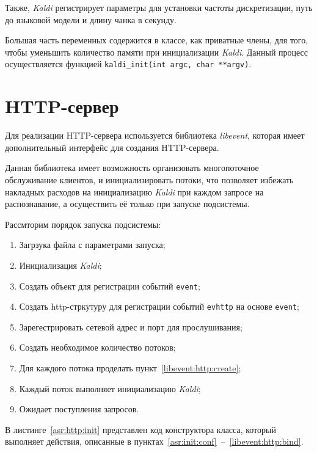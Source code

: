 Также, \textit{Kaldi} регистрирует параметры для установки частоты дискретизации,
путь до языковой модели и длину чанка в секунду.

Большая часть переменных содержится в классе, как приватные члены, для того, чтобы
уменьшить количество памяти при инициализации \textit{Kaldi}.
Данный процесс осуществляется функцией \texttt{kaldi\_init(int argc, char **argv)}.
\section{HTTP-сервер}

Для реализации HTTP-сервера используется библиотека \textit{libevent}, которая
имеет дополнительный интерфейс для создания HTTP-сервера.

Данная библиотека имеет возможность организовать многопоточное обслуживание клиентов,
и инициализировать потоки, что позволяет избежать накладных расходов на инициализацию
\textit{Kaldi} при каждом запросе на распознавание, а осуществить её только
при запуске подсистемы.

Рассмторим порядок запуска подсистемы:
\begin{enumerate}
    \item Загрзука файла с параметрами запуска;\label{asr:init:conf}
    \item Инициализация \textit{Kaldi};\label{asr:init:kaldi}
    \item Создать объект для регистрации событий \texttt{event};\label{libevent:event:create}
    \item Создать http-стркутуру для регистрации событий \texttt{evhttp}
        на основе \texttt{event};\label{libevent:http:create}
    \item Зарегестрировать сетевой адрес и порт для прослушивания;\label{libevent:http:bind}
    \item Создать необходимое количество потоков;
    \item Для каждого потока проделать пункт~\ref{libevent:http:create};
    \item Каждый поток выполняет инициализацию \textit{Kaldi};
    \item Ожидает поступления запросов.
\end{enumerate}

В листинге~\ref{asr:http:init} представлен код конструктора класса, который
выполняет действия, описанные в пунктах~\ref{asr:init:conf}~--~\ref{libevent:http:bind}.


